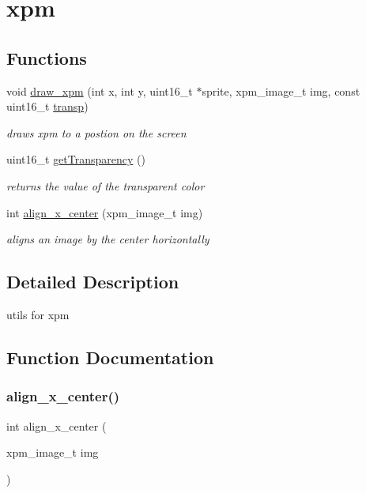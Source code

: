 \hypertarget{group__xpm}{}\section{xpm}
\label{group__xpm}
\subsection*{Functions}
\begin{DoxyCompactItemize}
\item 
void \mbox{\hyperlink{group__xpm_ga92528cf77a6ddfa6a4844c50896600a7}{draw\+\_\+xpm}} (int x, int y, uint16\+\_\+t $\ast$sprite, xpm\+\_\+image\+\_\+t img, const uint16\+\_\+t \mbox{\hyperlink{game_8c_a965e392ceb7250e27fd2bc5a17f65f1b}{transp}})
\begin{DoxyCompactList}\small\item\em draws xpm to a postion on the screen \end{DoxyCompactList}\item 
uint16\+\_\+t \mbox{\hyperlink{group__xpm_ga17ee83c00b60b303af02d92b1ad8c64f}{get\+Transparency}} ()
\begin{DoxyCompactList}\small\item\em returns the value of the transparent color \end{DoxyCompactList}\item 
int \mbox{\hyperlink{group__xpm_ga7b37b2adae7cdc46c3092db82641ba9a}{align\+\_\+x\+\_\+center}} (xpm\+\_\+image\+\_\+t img)
\begin{DoxyCompactList}\small\item\em aligns an image by the center horizontally \end{DoxyCompactList}\end{DoxyCompactItemize}


\subsection{Detailed Description}
utils for xpm 

\subsection{Function Documentation}
\mbox{\label{group__xpm_ga7b37b2adae7cdc46c3092db82641ba9a}} 
\subsubsection{\texorpdfstring{align\_x\_center()}{align\_x\_center()}}
{\footnotesize\ttfamily int align\+\_\+x\+\_\+center (\begin{DoxyParamCaption}\item[{xpm\+\_\+image\+\_\+t}]{img }\end{DoxyParamCaption})}



